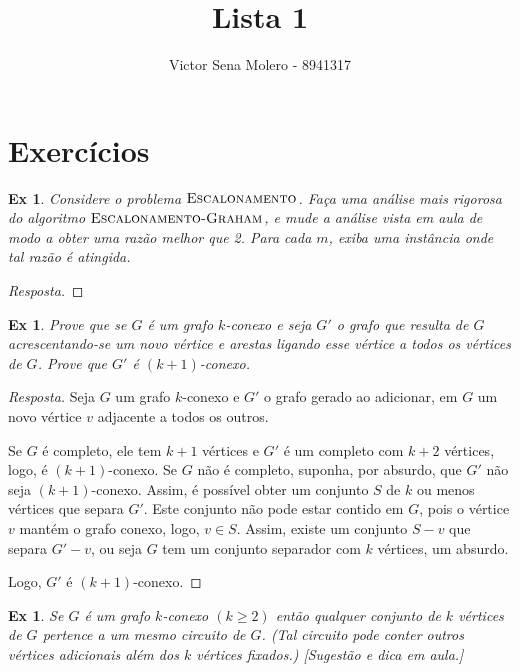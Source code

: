 \documentclass[12pt]{article}
\newcounter{exCounter}
\newtheorem{ex}[exCounter]{Ex}
\begin{document}
 
 
\title{Lista 1}
\author{Victor Sena Molero - 8941317}
\maketitle

\section{Exercícios}
\begin{ex}
Considere o problema $\textsc{Escalonamento}$. Faça uma análise mais rigorosa do algoritmo $\textsc{Escalonamento-Graham}$, e mude a análise vista em aula de modo a obter uma razão melhor que 2. Para cada $m$, exiba uma instância onde tal razão é atingida.
\end{ex}

\begin{proof}[Resposta]
\end{proof}

\begin{ex}
Prove que se $G$ é um grafo $k$-conexo e seja $G'$ o grafo que resulta de $G$ acrescentando-se um novo vértice e arestas ligando esse vértice a todos os vértices de $G$. Prove que $G'$ é $(k+1)$-conexo.
\end{ex}

\begin{proof}[Resposta]
Seja $G$ um grafo $k$-conexo e $G'$ o grafo gerado ao adicionar, em $G$ um novo vértice $v$ adjacente a todos os outros.

Se $G$ é completo, ele tem $k+1$ vértices e $G'$ é um completo com $k+2$ vértices, logo, é $(k+1)$-conexo. Se $G$ não é completo, suponha, por absurdo, que $G'$ não seja $(k+1)$-conexo. Assim, é possível obter um conjunto $S$ de $k$ ou menos vértices que separa $G'$. Este conjunto não pode estar contido em $G$, pois o vértice $v$ mantém o grafo conexo, logo, $v \in S$. Assim, existe um conjunto $S-v$ que separa $G'-v$, ou seja $G$ tem um conjunto separador com $k$ vértices, um absurdo.

Logo, $G'$ é $(k+1)$-conexo.
\end{proof}

\begin{ex}
Se $G$ é um grafo $k$-conexo $(k \geq 2)$ então qualquer conjunto de $k$ vértices de $G$ pertence a um mesmo circuito de $G$. (Tal circuito pode conter outros vértices adicionais além dos $k$ vértices fixados.) [Sugestão e dica em aula.]
\end{ex}
\end{document}
